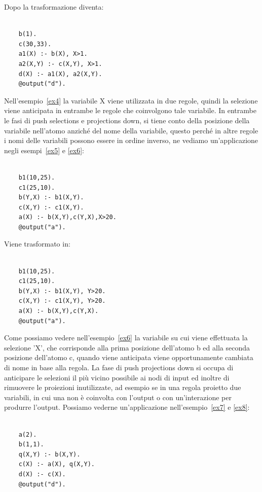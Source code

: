 Dopo la trasformazione diventa: 
\begin{example}\label{ex4}
	\begin{lstlisting}
	
	b(1). 
	c(30,33). 
	a1(X) :- b(X), X>1. 
	a2(X,Y) :- c(X,Y), X>1. 
	d(X) :- a1(X), a2(X,Y). 
	@output("d").
	\end{lstlisting}
\end{example}
Nell'esempio~\ref{ex4} la variabile X viene utilizzata in due regole, quindi la selezione viene anticipata in entrambe le regole che coinvolgono tale variabile. \newline
In entrambe le fasi di push selections e projections down, si tiene conto della posizione della variabile nell'atomo anziché del nome della variabile, questo perché in altre regole i nomi delle variabili possono essere in ordine inverso, ne vediamo un'applicazione negli esempi~\ref{ex5} e \ref{ex6}:
\begin{example}\label{ex5}
	\begin{lstlisting}
	
	b1(10,25). 
	c1(25,10). 
	b(Y,X) :- b1(X,Y). 
	c(X,Y) :- c1(X,Y). 
	a(X) :- b(X,Y),c(Y,X),X>20. 
	@output("a").
	\end{lstlisting}
\end{example}
Viene trasformato in:
\begin{example}\label{ex6}
	\begin{lstlisting}
	
	b1(10,25). 
	c1(25,10). 
	b(Y,X) :- b1(X,Y), Y>20. 
	c(X,Y) :- c1(X,Y), Y>20. 
	a(X) :- b(X,Y),c(Y,X). 
	@output("a").
	\end{lstlisting}
\end{example}
Come possiamo vedere nell'esempio~\ref{ex6} la variabile su cui viene effettuata la selezione 'X', che corrisponde alla prima posizione dell'atomo b ed alla seconda posizione dell'atomo c, quando viene anticipata viene opportunamente cambiata di nome in base alla regola. \newline \newline
La fase di push projections down si occupa di anticipare le selezioni il più vicino possibile ai nodi di input ed inoltre di rimuovere le proiezioni inutilizzate, ad esempio se in una regola proietto due variabili, in cui una non è coinvolta con l'output o con un'interazione per produrre l'output. Possiamo vederne un'applicazione nell'esempio~\ref{ex7} e \ref{ex8}:
\begin{example}\label{ex7}
	\begin{lstlisting}
	
	a(2). 
	b(1,1). 
	q(X,Y) :- b(X,Y). 
	c(X) :- a(X), q(X,Y). 
	d(X) :- c(X). 
	@output("d").
	\end{lstlisting}
\end{example}
